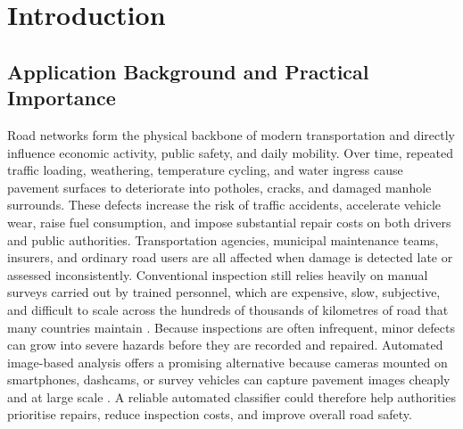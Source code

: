 \documentclass[preprint,12pt]{elsarticle}
\begin{document}
\section{Introduction}

\subsection{Application Background and Practical Importance}

Road networks form the physical backbone of modern transportation and directly influence economic activity, public safety, and daily mobility.
Over time, repeated traffic loading, weathering, temperature cycling, and water ingress cause pavement surfaces to deteriorate into potholes, cracks, and damaged manhole surrounds.
These defects increase the risk of traffic accidents, accelerate vehicle wear, raise fuel consumption, and impose substantial repair costs on both drivers and public authorities.
Transportation agencies, municipal maintenance teams, insurers, and ordinary road users are all affected when damage is detected late or assessed inconsistently.
Conventional inspection still relies heavily on manual surveys carried out by trained personnel, which are expensive, slow, subjective, and difficult to scale across the hundreds of thousands of kilometres of road that many countries maintain \cite{maeda2018road, arya2024global}.
Because inspections are often infrequent, minor defects can grow into severe hazards before they are recorded and repaired.
Automated image-based analysis offers a promising alternative because cameras mounted on smartphones, dashcams, or survey vehicles can capture pavement images cheaply and at large scale \cite{vinodhini2024pothole}.
A reliable automated classifier could therefore help authorities prioritise repairs, reduce inspection costs, and improve overall road safety.
\end{document}
